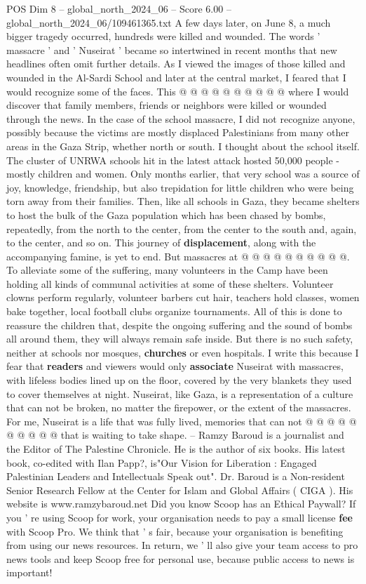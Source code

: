 \begin{textsample}{POS Dim 8 – global\_north\_2024\_06 – Score 6.00 – global\_north\_2024\_06/109461365.txt}
A few days later, on June 8, a much bigger tragedy occurred, hundreds were killed and wounded.
The words ' massacre ' and ' Nuseirat ' became so intertwined in recent months that new headlines often omit further details.
As I viewed the images of those killed and wounded in the Al-Sardi School and later at the central market, I feared that I would recognize some of the faces.
This @ @ @ @ @ @ @ @ @ @ where I would discover that family members, friends or neighbors were killed or wounded through the news.
In the case of the school massacre, I did not recognize anyone, possibly because the victims are mostly displaced Palestinians from many other areas in the Gaza Strip, whether north or south.
I thought about the school itself.
The cluster of UNRWA schools hit in the latest attack hosted 50,000 people - mostly children and women.
Only months earlier, that very school was a source of joy, knowledge, friendship, but also trepidation for little children who were being torn away from their families.
Then, like all schools in Gaza, they became shelters to host the bulk of the Gaza population which has been chased by bombs, repeatedly, from the north to the center, from the center to the south and, again, to the center, and so on.
This journey of \textbf{displacement}, along with the accompanying famine, is yet to end.
But massacres at @ @ @ @ @ @ @ @ @ @.
To alleviate some of the suffering, many volunteers in the Camp have been holding all kinds of communal activities at some of these shelters.
Volunteer clowns perform regularly, volunteer barbers cut hair, teachers hold classes, women bake together, local football clubs organize tournaments.
All of this is done to reassure the children that, despite the ongoing suffering and the sound of bombs all around them, they will always remain safe inside.
But there is no such safety, neither at schools nor mosques, \textbf{churches} or even hospitals.
I write this because I fear that \textbf{readers} and viewers would only \textbf{associate} Nuseirat with massacres, with lifeless bodies lined up on the floor, covered by the very blankets they used to cover themselves at night.
Nuseirat, like Gaza, is a representation of a culture that can not be broken, no matter the firepower, or the extent of the massacres.
For me, Nuseirat is a life that was fully lived, memories that can not @ @ @ @ @ @ @ @ @ @ that is waiting to take shape. -- Ramzy Baroud is a journalist and the Editor of The Palestine Chronicle.
He is the author of six books.
His latest book, co-edited with Ilan Papp?, is"Our Vision for Liberation : Engaged Palestinian Leaders and Intellectuals Speak out".
Dr.
Baroud is a Non-resident Senior Research Fellow at the Center for Islam and Global Affairs ( CIGA ).
His website is www.ramzybaroud.net Did you know Scoop has an Ethical Paywall?
If you ' re using Scoop for work, your organisation needs to pay a small license \textbf{fee} with Scoop Pro.
We think that ' s fair, because your organisation is benefiting from using our news resources.
In return, we ' ll also give your team access to pro news tools and keep Scoop free for personal use, because public access to news is important!


\end{textsample}
